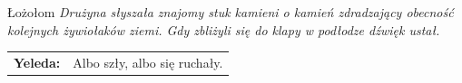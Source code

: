 \documentclass[10pt,twoside,twocolumn]{book}
\begin{document}
\begin{rpg-quotebox}{Łożołom}
   \textit{Drużyna słyszała znajomy stuk kamieni o kamień zdradzający obecność kolejnych żywiołaków ziemi. Gdy zbliżyli się do klapy w podłodze dźwięk ustał.}\\

   \begin{tabularx}{\columnwidth}{lX}
      \textbf{Yeleda:} & Albo szły, albo się ruchały.\\
   \end{tabularx}
\end{rpg-quotebox}





%    
%       
\end{document}
